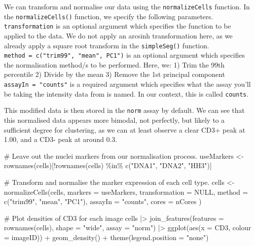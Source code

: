 \documentclass[
  letterpaper,
  DIV=11,
  numbers=noendperiod]{scrreprt}
\newenvironment{Shaded}{\begin{snugshade}}{\end{snugshade}}
\newcommand{\AttributeTok}[1]{\textcolor[rgb]{0.40,0.45,0.13}{#1}}
\newcommand{\CommentTok}[1]{\textcolor[rgb]{0.37,0.37,0.37}{#1}}
\newcommand{\ConstantTok}[1]{\textcolor[rgb]{0.56,0.35,0.01}{#1}}
\newcommand{\FunctionTok}[1]{\textcolor[rgb]{0.28,0.35,0.67}{#1}}
\newcommand{\NormalTok}[1]{\textcolor[rgb]{0.00,0.23,0.31}{#1}}
\newcommand{\OtherTok}[1]{\textcolor[rgb]{0.00,0.23,0.31}{#1}}
\newcommand{\SpecialCharTok}[1]{\textcolor[rgb]{0.37,0.37,0.37}{#1}}
\newcommand{\StringTok}[1]{\textcolor[rgb]{0.13,0.47,0.30}{#1}}
\begin{document}
We can transform and normalise our data using the
\texttt{normalizeCells} function. In the \texttt{normalizeCells()}
function, we specify the following parameters. \texttt{transformation}
is an optional argument which specifies the function to be applied to
the data. We do not apply an arcsinh transformation here, as we already
apply a square root transform in the \texttt{simpleSeg()} function.
\texttt{method\ =\ c("trim99",\ "mean",\ PC1")} is an optional argument
which specifies the normalisation method/s to be performed. Here, we: 1)
Trim the 99th percentile 2) Divide by the mean 3) Remove the 1st
principal component \texttt{assayIn\ =\ "counts"} is a required argument
which specifies what the assay you'll be taking the intensity data from
is named. In our context, this is called \texttt{counts}.

This modified data is then stored in the \texttt{norm} assay by default.
We can see that this normalised data appears more bimodal, not
perfectly, but likely to a sufficient degree for clustering, as we can
at least observe a clear CD3+ peak at 1.00, and a CD3- peak at around
0.3.

\begin{Shaded}
\begin{Highlighting}[]
\CommentTok{\# Leave out the nuclei markers from our normalisation process. }
\NormalTok{useMarkers }\OtherTok{\textless{}{-}} \FunctionTok{rownames}\NormalTok{(cells)[}\SpecialCharTok{!}\FunctionTok{rownames}\NormalTok{(cells) }\SpecialCharTok{\%in\%} \FunctionTok{c}\NormalTok{(}\StringTok{"DNA1"}\NormalTok{, }\StringTok{"DNA2"}\NormalTok{, }\StringTok{"HH3"}\NormalTok{)]}

\CommentTok{\# Transform and normalise the marker expression of each cell type.}
\NormalTok{cells }\OtherTok{\textless{}{-}} \FunctionTok{normalizeCells}\NormalTok{(cells,}
                        \AttributeTok{markers =}\NormalTok{ useMarkers,}
                        \AttributeTok{transformation =} \ConstantTok{NULL}\NormalTok{,}
                        \AttributeTok{method =} \FunctionTok{c}\NormalTok{(}\StringTok{"trim99"}\NormalTok{, }\StringTok{"mean"}\NormalTok{, }\StringTok{"PC1"}\NormalTok{),}
                        \AttributeTok{assayIn =} \StringTok{"counts"}\NormalTok{,}
                        \AttributeTok{cores =}\NormalTok{ nCores}
\NormalTok{)}

\CommentTok{\# Plot densities of CD3 for each image}
\NormalTok{cells }\SpecialCharTok{|\textgreater{}} 
  \FunctionTok{join\_features}\NormalTok{(}\AttributeTok{features =} \FunctionTok{rownames}\NormalTok{(cells), }\AttributeTok{shape =} \StringTok{"wide"}\NormalTok{, }\AttributeTok{assay =} \StringTok{"norm"}\NormalTok{) }\SpecialCharTok{|\textgreater{}} 
  \FunctionTok{ggplot}\NormalTok{(}\FunctionTok{aes}\NormalTok{(}\AttributeTok{x =}\NormalTok{ CD3, }\AttributeTok{colour =}\NormalTok{ imageID)) }\SpecialCharTok{+} 
  \FunctionTok{geom\_density}\NormalTok{() }\SpecialCharTok{+} 
  \FunctionTok{theme}\NormalTok{(}\AttributeTok{legend.position =} \StringTok{"none"}\NormalTok{)}
\end{Highlighting}
\end{Shaded}
\end{document}

